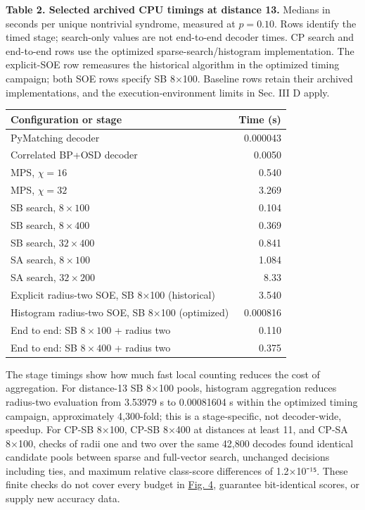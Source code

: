 \documentclass[
  10pt,
]{article}
\makeatletter
\newcommand{\fixedlabel}[2]{\phantomsection\def\@currentlabel{#2}\label{#1}}
\makeatother
\begin{document}
\par
\noindent\begin{minipage}{\linewidth}
\fixedlabel{tab:2}{2}\textbf{Table 2. Selected archived CPU timings at distance 13.} Medians
in seconds per unique nontrivial syndrome, measured at \(p=0.10\). Rows
identify the timed stage; search-only values are not end-to-end decoder
times. CP search and end-to-end rows use the optimized
sparse-search/histogram implementation. The explicit-SOE row remeasures
the historical algorithm in the optimized timing campaign; both SOE rows
specify SB 8×100. Baseline rows retain their archived implementations,
and the execution-environment limits in Sec. III D apply.

\begin{longtable}[]{@{}lr@{}}
\toprule\noalign{}
Configuration or stage & Time (s) \\
\midrule\noalign{}
\endhead
\bottomrule\noalign{}
\endlastfoot
PyMatching decoder & 0.000043 \\
Correlated BP+OSD decoder & 0.0050 \\
MPS, \(\chi=16\) & 0.540 \\
MPS, \(\chi=32\) & 3.269 \\
SB search, \(8\times100\) & 0.104 \\
SB search, \(8\times400\) & 0.369 \\
SB search, \(32\times400\) & 0.841 \\
SA search, \(8\times100\) & 1.084 \\
SA search, \(32\times200\) & 8.33 \\
Explicit radius-two SOE, SB 8×100 (historical) & 3.540 \\
Histogram radius-two SOE, SB 8×100 (optimized) & 0.000816 \\
End to end: SB \(8\times100\) + radius two & 0.110 \\
End to end: SB \(8\times400\) + radius two & 0.375 \\
\end{longtable}
\end{minipage}
\par

The stage timings show how much fast local counting reduces the cost of
aggregation. For distance-13 SB 8×100 pools, histogram aggregation
reduces radius-two evaluation from 3.53979 s to 0.00081604 s within the
optimized timing campaign, approximately 4,300-fold; this is a
stage-specific, not decoder-wide, speedup. For CP-SB 8×100, CP-SB 8×400
at distances at least 11, and CP-SA 8×100, checks of radii one and two
over the same 42,800 decodes found identical candidate pools between
sparse and full-vector search, unchanged decisions including ties, and
maximum relative class-score differences of 1.2×10⁻¹⁵. These finite
checks do not cover every budget in \hyperref[fig:4]{Fig. 4}, guarantee bit-identical
scores, or supply new accuracy data.
\end{document}
